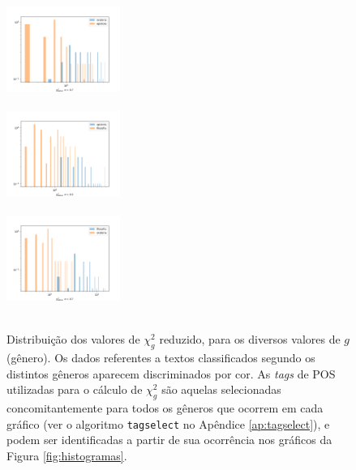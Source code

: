 \documentclass[10pt,a4paper,onecolumn]{article}
\theoremstyle{definition}
\theoremstyle{remark}
\begin{document}
\begin{figure}[htpb!]
\begin{multicols}{3}
	\end{multicols}
	\begin{multicols}{3}
		\includegraphics[width=0.33\textwidth]{graficos/histograma2_epistola_oratoria.png} \\ \vspace{0.15cm}  \\
		\includegraphics[width=0.33\textwidth]{graficos/histograma2_filosofia_epistola.png} \\ \vspace{0.15cm}  \\
		\includegraphics[width=0.33\textwidth]{graficos/histograma2_oratoria_filosofia.png} \\ \vspace{0.15cm}  \\
	\end{multicols}
	\caption{Distribuição dos valores de $\chi^2_g$ reduzido, para os diversos valores de $g$ (gênero). Os dados referentes a textos classificados segundo os distintos gêneros aparecem discriminados por cor. As \emph{tags} de POS utilizadas para o cálculo de $\chi^2_g$ são aquelas selecionadas concomitantemente para todos os gêneros que ocorrem em cada gráfico (ver o algoritmo \texttt{tagselect} no Apêndice \ref{ap:tagselect}), e podem ser identificadas a partir de sua ocorrência nos gráficos da Figura \ref{fig:histogramas}.}
	\label{fig:histogramas_chis}
\end{figure}
\end{document}
